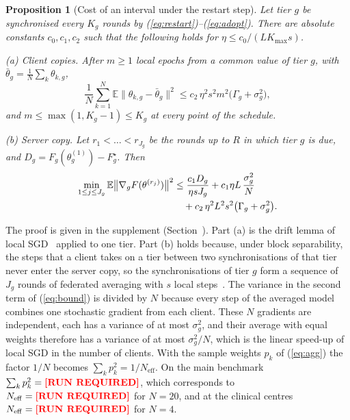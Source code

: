 \documentclass[journal]{IEEEtran}
\newcommand{\runreq}{\textbf{\textcolor{red}{[RUN REQUIRED]}}}
\newcommand{\num}[1]{\ifcsdef{#1}{\csname #1\endcsname}{\runreq}}
\newtheorem{proposition}{Proposition}
\begin{document}
\begin{proposition}[Cost of an interval under the restart step]
\label{prop:bound}
Let tier $g$ be synchronised every $K_g$ rounds by (\ref{eq:restart})--(\ref{eq:adopt}). There are absolute constants $c_0,c_1,c_2$ such that the following holds for $\eta\le c_0/(LK_{\max}s)$.

\noindent(a) \emph{Client copies.} After $m\ge1$ local epochs from a common value of tier $g$, with $\bar\theta_g=\frac1N\sum_k\theta_{k,g}$,
\begin{equation}
\frac1N\sum_{k=1}^N\mathbb E\big\|\theta_{k,g}-\bar\theta_g\big\|^2\le c_2\,\eta^2s^2m^2\big(\Gamma_g+\sigma_g^2\big),
\label{eq:drift}
\end{equation}
and $m\le\max(1,K_g-1)\le K_g$ at every point of the schedule.

\noindent(b) \emph{Server copy.} Let $r_1<\dots<r_{J_g}$ be the rounds up to $R$ in which tier $g$ is due, and $D_g=F_g(\theta_g^{(1)})-F_g^\star$. Then
\begin{align}
\min_{1\le j\le J_g}\mathbb E\big\|\nabla_gF(\theta^{(r_j)})\big\|^2
&\le \frac{c_1D_g}{\eta sJ_g}+c_1\eta L\,\frac{\sigma_g^2}{N}\notag\\
&\quad+c_2\,\eta^2L^2s^2\big(\Gamma_g+\sigma_g^2\big).
\label{eq:bound}
\end{align}
\end{proposition}
The proof is given in the supplement (Section~). Part (a) is the drift lemma of local SGD~\cite{stich2019,khaled2020} applied to one tier. Part (b) holds because, under block separability, the steps that a client takes on a tier between two synchronisations of that tier never enter the server copy, so the synchronisations of tier $g$ form a sequence of $J_g$ rounds of federated averaging with $s$ local steps~\cite{wang2020fednova,karimireddy2020}. The variance in the second term of (\ref{eq:bound}) is divided by $N$ because every step of the averaged model combines one stochastic gradient from each client. These $N$ gradients are independent, each has a variance of at most $\sigma_g^2$, and their average with equal weights therefore has a variance of at most $\sigma_g^2/N$, which is the linear speed-up of local SGD in the number of clients. With the sample weights $p_k$ of (\ref{eq:agg}) the factor $1/N$ becomes $\sum_kp_k^2=1/N_{\mathrm{eff}}$. On the main benchmark $\sum_kp_k^2=\num{tmSumPSq}$, which corresponds to $N_{\mathrm{eff}}=\num{tmNeff}$ for $N=20$, and at the clinical centres $N_{\mathrm{eff}}=\num{tmHospNeff}$ for $N=4$.
\end{document}
